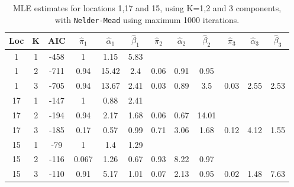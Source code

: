 \begin{table}
\centering
\begin{tabular}{ |c|c|c||c|c|c||c|c|c||c|c|c| } 
\hline
Loc & K & AIC & $\hat\pi_1$ & $\hat\alpha_1$ & $\hat\beta_1$
& $\hat\pi_2$ & $\hat\alpha_2$ & $\hat\beta_2$
& $\hat\pi_3$ & $\hat\alpha_3$ & $\hat\beta_3$\\
\hline
 \hline
1 & 1 & -458 & 1 & 1.15 & 5.83
& & &
& & & \\

1 & 2 & -711 & 0.94 & 15.42 &  2.4
& 0.06 & 0.91 & 0.95
& & &\\

1 & 3 & -705 & 0.94 & 13.67 & 2.41
& 0.03 & 0.89 &  3.5
& 0.03 & 2.55 & 2.53 \\
\hline
17 & 1 & -147 & 1 & 0.88 & 2.41
& & &
& & &\\

17 & 2 & -194 & 0.94 & 2.17 & 1.68
 &  0.06 & 0.67  & 14.01
 & & &\\
 
17 & 3 & -185 & 0.17  &  0.57  &   0.99
& 0.71  & 3.06 & 1.68
 & 0.12 & 4.12 & 1.55\\
 \hline
15 & 1 & -79 & 1 & 1.4 & 1.29
& & &
& & &\\

15 & 2 & -116 & 0.067 & 1.26 & 0.67
& 0.93 & 8.22 & 0.97
& & &\\

15 & 3 & -110 & 0.91 & 5.17 & 1.01
& 0.07 & 2.13 & 0.95
&  0.02 & 1.48  & 7.63 \\
 \hline
\end{tabular}
\caption{MLE estimates for locations 1,17 and 15, using K=1,2 and 3 components, with \texttt{Nelder-Mead} using maximum 1000 iterations.}
\label{table:estimates}
\end{table}




